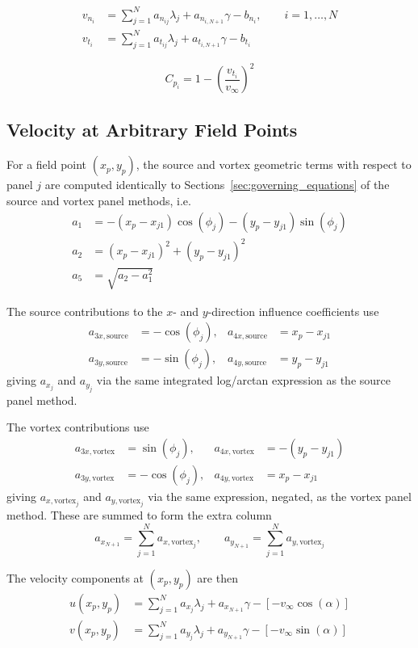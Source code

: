 \begin{align*}
    v_{n_i} &= \sum_{j=1}^{N} a_{n_{ij}} \lambda_j + a_{n_{i,N+1}} \gamma - b_{n_i}, \qquad i = 1, \dots, N \\
    v_{t_i} &= \sum_{j=1}^{N} a_{t_{ij}} \lambda_j + a_{t_{i,N+1}} \gamma - b_{t_i}
\end{align*}

\[
    C_{p_i} = 1 - \left(\frac{v_{t_i}}{v_\infty}\right)^2
\]

\subsection{Velocity at Arbitrary Field Points}
\label{subsec:velocity-at-arbitrary-field-points}

For a field point $(x_p, y_p)$, the source and vortex geometric terms with respect to panel $j$ are computed
identically to Sections~\ref{sec:governing_equations} of the source and vortex panel methods, i.e.
\begin{align*}
    a_{1} &= -(x_p - x_{j1})\cos(\phi_j) - (y_p - y_{j1})\sin(\phi_j) \\
    a_{2} &= (x_p - x_{j1})^2 + (y_p - y_{j1})^2 \\
    a_{5} &= \sqrt{a_2 - a_1^2}
\end{align*}

The source contributions to the $x$- and $y$-direction influence coefficients use
\begin{align*}
    a_{3x,\text{source}} &= -\cos(\phi_j), & a_{4x,\text{source}} &= x_p - x_{j1} \\
    a_{3y,\text{source}} &= -\sin(\phi_j), & a_{4y,\text{source}} &= y_p - y_{j1}
\end{align*}
giving $a_{x_j}$ and $a_{y_j}$ via the same integrated log/arctan expression as the source panel method.

The vortex contributions use
\begin{align*}
    a_{3x,\text{vortex}} &= \sin(\phi_j), & a_{4x,\text{vortex}} &= -(y_p - y_{j1}) \\
    a_{3y,\text{vortex}} &= -\cos(\phi_j), & a_{4y,\text{vortex}} &= x_p - x_{j1}
\end{align*}
giving $a_{x,\text{vortex}_j}$ and $a_{y,\text{vortex}_j}$ via the same expression, negated, as the vortex panel
method.
These are summed to form the extra column
\[
    a_{x_{N+1}} = \sum_{j=1}^{N} a_{x,\text{vortex}_j}, \qquad a_{y_{N+1}} = \sum_{j=1}^{N} a_{y,\text{vortex}_j}
\]

The velocity components at $(x_p, y_p)$ are then
\begin{align*}
    u(x_p, y_p) &= \sum_{j=1}^{N} a_{x_j} \lambda_j + a_{x_{N+1}} \gamma - \left[-v_\infty \cos(\alpha)\right] \\
    v(x_p, y_p) &= \sum_{j=1}^{N} a_{y_j} \lambda_j + a_{y_{N+1}} \gamma - \left[-v_\infty \sin(\alpha)\right]
\end{align*}
